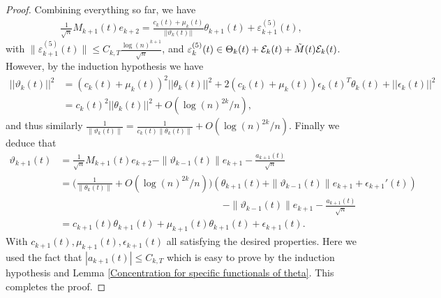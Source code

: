 \documentclass[10pt,a4paper]{amsart}
\begin{document}
\begin{proof}
Combining everything so far, we have
\begin{equation*}
    \begin{split}
        \frac{1}{\sqrt{n}}M_{k+1}(t)e_{k+2}=\frac{c_k(t)+\mu_k(t)}{||\vartheta_{k}(t)||}\theta_{k+1}(t)+ \varepsilon_{k+1}^{(5)}(t),
    \end{split}
\end{equation*}
with $\|\varepsilon_{k+1}^{(5)}(t)\|\leq C_{k,T}\frac{\log(n)^{k+1}}{\sqrt{n}}$, and $\varepsilon_k^{(5)}(t) \in \Theta_{k}(t)+\mathcal{E}_{k}(t)+\Tilde{M}(t)\mathcal{E}_{k}(t)$. However, by the induction hypothesis we have
\begin{equation}\label{Norm of theta computation}
    \begin{split}
        ||\vartheta_k(t)||^2&=(c_k(t)+\mu_k(t))^2||\theta_k(t)||^2+2(c_k(t)+\mu_k(t))\epsilon_k(t)^T\theta_k(t)+||\epsilon_k(t)||^2\\
        &=c_k(t)^2||\theta_k(t)||^2+O(\log(n)^{2k}/n),
    \end{split}
\end{equation}
and thus similarly $\frac{1}{\|\vartheta_k(t)\|}=\frac{1}{c_k(t)\|\theta_k(t)\|}+O(\log(n)^{2k}/n)$. Finally we deduce that 
\begin{equation*}
    \begin{split}
        \vartheta_{k+1}(t)&=\frac{1}{\sqrt{n}}M_{k+1}(t)e_{k+2}-\|\vartheta_{k-1}(t)\|e_{k+1}-\frac{a_{k+1}(t)}{\sqrt{n}}\\
        &=\bigg(\frac{1}{\|\theta_{k}(t)\|}+O(\log(n)^{2k}/n)\bigg)(\theta_{k+1}(t)+\|\vartheta_{k-1}(t)\|e_{k+1}+ \epsilon_{k+1}'(t))\\
        &\hspace{7cm}-\|\vartheta_{k-1}(t)\|e_{k+1}-\frac{a_{k+1}(t)}{\sqrt{n}}\\
        &=c_{k+1}(t)\theta_{k+1}(t)+\mu_{k+1}(t)\theta_{k+1}(t)+\epsilon_{k+1}(t).
    \end{split}
\end{equation*}
With $c_{k+1}(t),\mu_{k+1}(t),\epsilon_{k+1}(t)$ all satisfying the desired properties. Here we used the fact that $|a_{k+1}(t)| \leq C_{k,T}$ which is easy to prove by the induction hypothesis and Lemma \ref{Concentration for specific functionals of theta}. This completes the proof. 
\end{proof}
\end{document}
